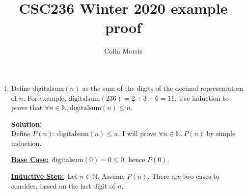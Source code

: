 \documentclass[boldsans]{article}
\title{CSC236 Winter 2020 example proof}
\author{Colin Morris}
\newcommand{\N}{\mathbb{N}}
\newcommand{\proofheader}[1]{\noindent \underline{\textbf{#1}}~}
\newcommand{\base}{\proofheader{Base Case:}}
\newcommand{\istep}{\proofheader{Inductive Step:}}
\newenvironment{solution}
{\bigskip \noindent \textbf{Solution: \\}}
{}
\begin{document}
\maketitle

\begin{enumerate}

\newcommand{\DS}{{\mathrm{digitalsum}}}
\item Define $\DS(n)$ as the sum of the digits of the decimal representation of $n$. For example, $\DS(236) = 2 + 3 + 6 = 11$. Use induction to prove that $\forall n \in \N, \DS(n) \leq n$.

\begin{solution}
Define $P(n)$: $\DS(n) \leq n$. I will prove $\forall n \in \N, P(n)$ by simple induction.

\base $\DS(0) = 0 \leq 0$, hence $P(0)$.

\istep Let $n \in \N$. Assume $P(n)$. There are two cases to consider, based on the last digit of $n$.


\end{solution}
\end{enumerate}
\end{document}
